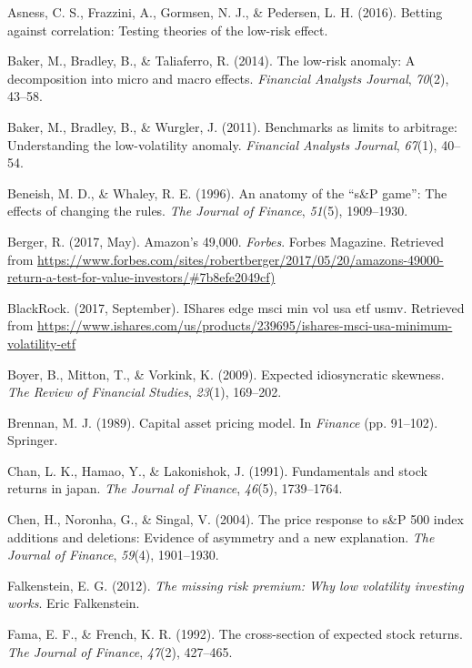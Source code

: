 \documentclass[12pt,twoside]{reedthesis}
\theoremstyle{definition}
\theoremstyle{definition}
\theoremstyle{definition}
\theoremstyle{remark}
\begin{document}
\hypertarget{ref-asness2016}{}
Asness, C. S., Frazzini, A., Gormsen, N. J., \& Pedersen, L. H. (2016).
Betting against correlation: Testing theories of the low-risk effect.

\hypertarget{ref-baker2014}{}
Baker, M., Bradley, B., \& Taliaferro, R. (2014). The low-risk anomaly:
A decomposition into micro and macro effects. \emph{Financial Analysts
Journal}, \emph{70}(2), 43--58.

\hypertarget{ref-baker2011}{}
Baker, M., Bradley, B., \& Wurgler, J. (2011). Benchmarks as limits to
arbitrage: Understanding the low-volatility anomaly. \emph{Financial
Analysts Journal}, \emph{67}(1), 40--54.

\hypertarget{ref-beneish1996}{}
Beneish, M. D., \& Whaley, R. E. (1996). An anatomy of the ``s\&P
game'': The effects of changing the rules. \emph{The Journal of
Finance}, \emph{51}(5), 1909--1930.

\hypertarget{ref-berger2017}{}
Berger, R. (2017, May). Amazon's 49,000. \emph{Forbes}. Forbes Magazine.
Retrieved from
\url{https://www.forbes.com/sites/robertberger/2017/05/20/amazons-49000-return-a-test-for-value-investors/\#7b8efe2049cf)}

\hypertarget{ref-blackrock2017}{}
BlackRock. (2017, September). IShares edge msci min vol usa etf
\textbar{} usmv. Retrieved from
\url{https://www.ishares.com/us/products/239695/ishares-msci-usa-minimum-volatility-etf}

\hypertarget{ref-boyer2009}{}
Boyer, B., Mitton, T., \& Vorkink, K. (2009). Expected idiosyncratic
skewness. \emph{The Review of Financial Studies}, \emph{23}(1),
169--202.

\hypertarget{ref-brennan1989}{}
Brennan, M. J. (1989). Capital asset pricing model. In \emph{Finance}
(pp. 91--102). Springer.

\hypertarget{ref-chan1991}{}
Chan, L. K., Hamao, Y., \& Lakonishok, J. (1991). Fundamentals and stock
returns in japan. \emph{The Journal of Finance}, \emph{46}(5),
1739--1764.

\hypertarget{ref-chen2004}{}
Chen, H., Noronha, G., \& Singal, V. (2004). The price response to s\&P
500 index additions and deletions: Evidence of asymmetry and a new
explanation. \emph{The Journal of Finance}, \emph{59}(4), 1901--1930.

\hypertarget{ref-falkenstein2012}{}
Falkenstein, E. G. (2012). \emph{The missing risk premium: Why low
volatility investing works}. Eric Falkenstein.

\hypertarget{ref-fama1992}{}
Fama, E. F., \& French, K. R. (1992). The cross-section of expected
stock returns. \emph{The Journal of Finance}, \emph{47}(2), 427--465.
\end{document}
